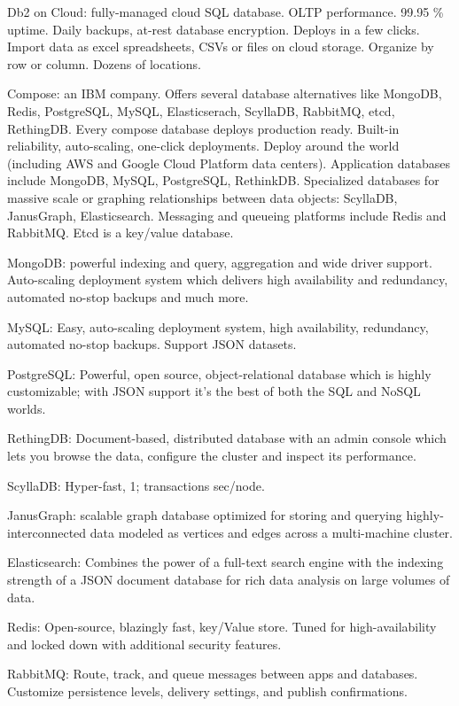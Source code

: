 Db2 on Cloud: fully-managed cloud SQL database. OLTP performance. 99.95 \% uptime. Daily backups, at-rest database encryption. Deploys in a few clicks. Import data as excel spreadsheets, CSVs or files on cloud storage. Organize by row or column. Dozens of locations.  

Compose: an IBM company. Offers several database alternatives like MongoDB, Redis, PostgreSQL, MySQL, Elasticserach, ScyllaDB, RabbitMQ, etcd, RethingDB. Every compose database deploys production ready. Built-in reliability, auto-scaling, one-click deployments. Deploy around the world (including AWS and Google Cloud Platform data centers). Application databases include MongoDB, MySQL, PostgreSQL, RethinkDB. Specialized databases for massive scale or graphing relationships between data objects: ScyllaDB, JanusGraph, Elasticsearch. Messaging and queueing platforms include Redis and RabbitMQ. Etcd is a key/value database. 

MongoDB: powerful indexing and query, aggregation and wide driver support. Auto-scaling deployment system which delivers high availability and redundancy, automated no-stop backups and much more. 

MySQL: Easy, auto-scaling deployment system, high availability, redundancy, automated no-stop backups. Support JSON datasets. 

PostgreSQL: Powerful, open source, object-relational database which is highly customizable; with JSON support it's the best of both the SQL and NoSQL worlds. 

RethingDB: Document-based, distributed database with an admin console which lets you browse the data, configure the cluster and inspect its performance. 

ScyllaDB: Hyper-fast, 1; transactions sec/node. 

JanusGraph: scalable graph database optimized for storing and querying highly-interconnected data modeled as vertices and edges across a multi-machine cluster. 

Elasticsearch: Combines the power of a full-text search engine with the indexing strength of a JSON document database for rich data analysis on large volumes of data. 

Redis: Open-source, blazingly fast, key/Value store. Tuned for high-availability and locked down with additional security features. 

RabbitMQ: Route, track, and queue messages between apps and databases. Customize persistence levels, delivery settings, and publish confirmations. 

